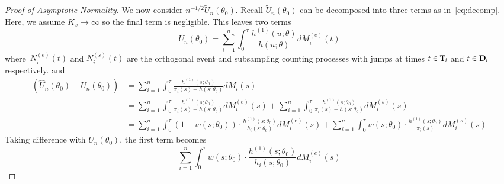 \documentclass[11pt]{amsart}
\def\bfT{{\bf T}}
\def\bfD{{\bf D}}
\begin{document}
\begin{proof}[Proof of Asymptotic Normality]
We now consider $n^{-1/2} \tilde U_n (\theta_0 )$. Recall $\tilde U_n (\theta_0)$ can be decomposed into three terms as in~\eqref{eq:decomp}. Here, we assume $K_x \to \infty$ so the final term is negligible.  This leaves two terms
$$
U_n (\theta_0) = \sum_{i=1}^n \int_0^\tau \frac{h^{(1)}(u; \theta)}{h (u;\theta)} dM_i^{(e)} (t)
$$
where~$N_i^{(e)} (t)$ and $N_i^{(s)} (t)$ are the orthogonal event and subsampling counting processes with jumps at times $t \in \bfT_i$ and $t \in \bfD_i$ respectively.
and
\begin{align*}
(\hat U_n (\theta_0) - U_n (\theta_0) )
&= \sum_{i=1}^n \int_0^\tau \frac{h^{(1)}(s; \theta_0)}{\pi_i (s) + h(s; \theta_0)} dM_i (s) \\
&= \sum_{i=1}^n \int_0^\tau \frac{h^{(1)}(s; \theta_0)}{\pi_i (s) + h(s; \theta_0)} dM^{(e)}_i (s) +
\sum_{i=1}^n \int_0^\tau \frac{h^{(1)}(s; \theta_0)}{\pi_i (s) + h(s; \theta_0)} dM_i^{(s)} (s) \\
&= \sum_{i=1}^n \int_0^\tau (1-w(s;\theta_0)) \cdot \frac{h^{(1)}(s; \theta_0)}{h_i (s;\theta_0)} dM_i^{(e)} (s) +
\sum_{i=1}^n \int_0^\tau w(s;\theta_0) \cdot \frac{h^{(1)}(s; \theta_0)}{\pi_i (s)} dM_i^{(s)} (s)
\end{align*}
Taking difference with $U_n(\theta_0)$, the first term becomes
\[
\sum_{i=1}^n \int_0^\tau w(s;\theta_0) \cdot \frac{h^{(1)}(s; \theta_0)}{h_i (s;\theta_0)} dM_i^{(e)} (s)
\]


\end{proof}
\end{document}
